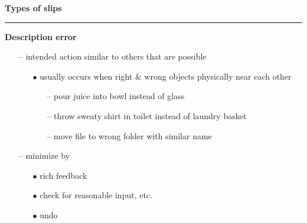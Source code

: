 \documentclass[pdf]{beamer}
\begin{document}
\begin{frame}
{\textbf{Types of slips}}{\textcolor{red}{\rule{12cm}{1.2pt}}}

	\textbf{Description error}
	\begin{itemize}
    	\item[--]intended action similar to others that are possible
		\begin{itemize}
        	\item[$\bullet$]usually occurs when right \& wrong objects physically near each other
				\begin{itemize}
					\item[--]pour juice into bowl instead of glass 
					\item[--]throw sweaty shirt in toilet instead of laundry basket 
					\item[--]move file to wrong folder with similar name \newline
				\end{itemize}
        \end{itemize}
        \item[--] minimize by
        \begin{itemize}
        	\item[$\bullet$]rich feedback
			\item[$\bullet$]check for reasonable input, etc.
			\item[$\bullet$]undo\newline \newline \newline
        \end{itemize}
	\end{itemize}
	
\end{frame}
\end{document}
